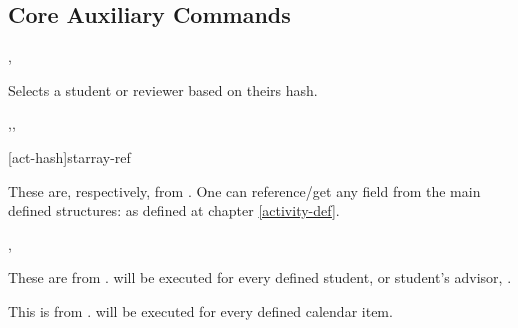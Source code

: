 \documentclass[article,nogeometry,english,tocdepth=3,secdepth=3]{ufrgscca} %
\begin{document}
\subsection{Core Auxiliary Commands}


\begin{codedescribe}[code,new=2023/11/18]{\studentselect,\studentReviewerSelect}
	\begin{codesyntax}%
	\end{codesyntax}
Selects a student or reviewer based on theirs hash.
\end{codedescribe}




\begin{codedescribe}[code,new=2023/11/18]{\DataFields,\eDataSet,\eDataFields}
	\begin{codesyntax}%
    \tsmacro{\eDataSet}[act-hash]{starray-ref}
	\end{codesyntax}
These are, respectively,  from . One can reference/get any field from the main  defined structures:  as defined at chapter \ref{activity-def}.
\end{codedescribe}


\begin{codedescribe}[code,new=2023/11/18,update=2023/12/02]{\studentiterate,\studentadvisoriterate}
	\begin{codesyntax}%
	\end{codesyntax}
These are  from .  will be executed for every defined student, \tsobj{\studentiterate} or student's advisor, \tsobj{\studentadvisoriterate}.
\end{codedescribe}

\begin{codedescribe}[code,new=2023/11/29]{\ActivityCalendarIterate}
	\begin{codesyntax}%
	\end{codesyntax}
This is  from .  will be executed for every defined calendar item.
\end{codedescribe}
\end{document}
